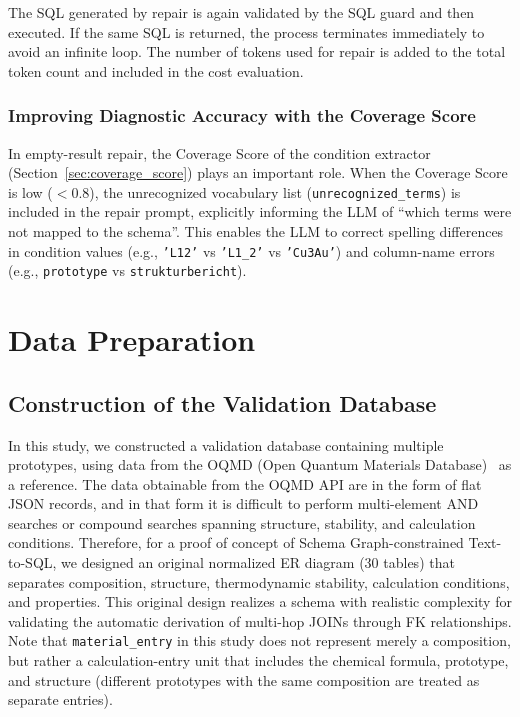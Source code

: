 \documentclass[5p,twocolumn]{elsarticle}
\begin{document}
The SQL generated by repair is again validated by the SQL guard and then executed.
If the same SQL is returned, the process terminates immediately to avoid an infinite loop.
The number of tokens used for repair is added to the total token count
and included in the cost evaluation.

\subsubsection{Improving Diagnostic Accuracy with the Coverage Score}

In empty-result repair, the Coverage Score of the condition extractor
(Section~\ref{sec:coverage_score}) plays an important role.
When the Coverage Score is low ($<0.8$), the unrecognized vocabulary list
(\texttt{unrecognized\_terms}) is included in the repair prompt,
explicitly informing the LLM of ``which terms were not mapped to the schema''.
This enables the LLM to correct spelling differences in condition values (e.g., \texttt{'L12'} vs
\texttt{'L1\_2'} vs \texttt{'Cu3Au'}) and
column-name errors (e.g., \texttt{prototype} vs
\texttt{strukturbericht}).
\section{Data Preparation}
\label{sec:data}

\subsection{Construction of the Validation Database}

In this study, we constructed a validation database containing multiple prototypes,
using data from the OQMD (Open Quantum Materials Database)~\citep{saal2013oqmd}
as a reference.
The data obtainable from the OQMD API are in the form of flat JSON records,
and in that form it is difficult to perform multi-element AND searches or
compound searches spanning structure, stability, and calculation conditions.
Therefore, for a proof of concept of Schema Graph-constrained Text-to-SQL,
we designed an original normalized ER diagram (30 tables) that separates
composition, structure, thermodynamic stability, calculation conditions, and properties.
This original design realizes a schema with realistic complexity for validating
the automatic derivation of multi-hop JOINs through FK relationships.
Note that \texttt{material\_entry} in this study does not represent merely a composition,
but rather a calculation-entry unit that includes the chemical formula, prototype, and structure
(different prototypes with the same composition are treated as separate entries).
\end{document}
